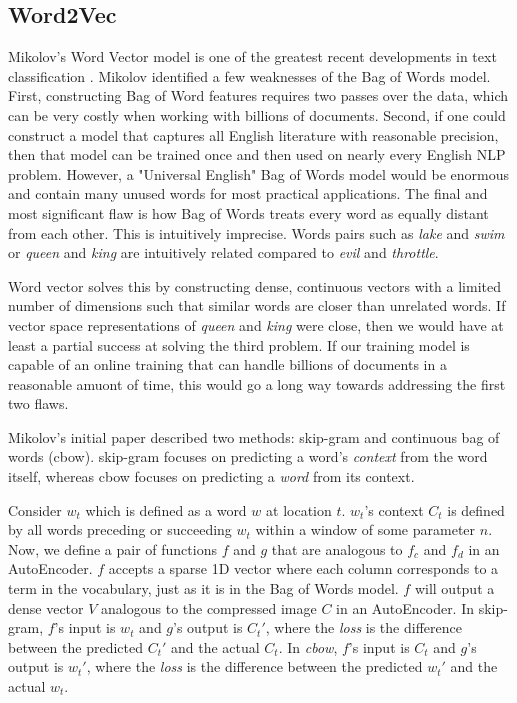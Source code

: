 \subsection{Word2Vec}

\par{
Mikolov's Word Vector model is one of the greatest recent developments in text classification \cite{word2vec}. Mikolov identified a few weaknesses of the Bag of Words model. First, constructing Bag of Word features requires two passes over the data, which can be very costly when working with billions of documents. Second, if one could construct a model that captures all English literature with reasonable precision, then that model can be trained once and then used on nearly every English NLP problem. However, a "Universal English" Bag of Words model would be enormous and contain many unused words for most practical applications. The final and most significant flaw is how Bag of Words treats every word as equally distant from each other. This is intuitively imprecise. Words pairs such as \textit{lake} and \textit{swim} or \textit{queen} and \textit{king} are intuitively related compared to \textit{evil} and \textit{throttle}.
}

\par{
Word vector solves this by constructing dense, continuous vectors with a limited number of dimensions such that similar words are closer than unrelated words. If vector space representations of \textit{queen} and \textit{king} were close, then we would have at least a partial success at solving the third problem. If our training model is capable of an online training that can handle billions of documents in a reasonable amuont of time, this would go a long way towards addressing the first two flaws.
}

\par{
Mikolov's initial paper described two methods: \textsf{skip-gram} and \textsf{continuous bag of words (cbow)}. \textsf{skip-gram} focuses on predicting a word's \textit{context} from the word itself, whereas \textsf{cbow} focuses on predicting a \textit{word} from its context. 
}

\par{
Consider $w_t$ which is defined as a word $w$ at location $t$. $w_t$'s context $C_t$ is defined by all words preceding or succeeding $w_t$ within a window of some parameter $n$. Now, we define a pair of functions $f$ and $g$ that are analogous to $f_c$ and $f_d$ in an AutoEncoder. $f$ accepts a sparse 1D vector where each column corresponds to a term in the vocabulary, just as it is in the Bag of Words model. $f$ will output a dense vector $V$ analogous to the compressed image $C$ in an AutoEncoder. In \textsf{skip-gram}, $f$'s input is $w_t$ and $g$'s output is $C_t'$, where the \textit{loss} is the difference between the predicted $C_t'$ and the actual $C_t$. In \textit{cbow}, $f$'s input is $C_t$ and $g$'s output is $w_t'$, where the \textit{loss} is the difference between the predicted $w_t'$ and the actual $w_t$. 
}


